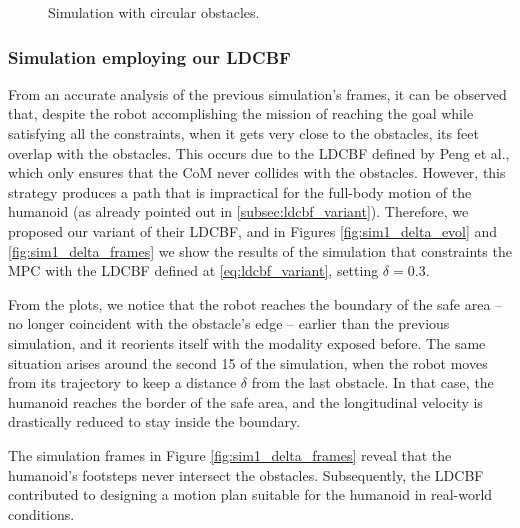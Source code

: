 \begin{figure}[H]
\begin{subfigure}{0.35\textwidth}
    \end{subfigure}
    \caption[short]{Simulation with circular obstacles.}
    \label{fig:sim1_frames}
\end{figure}
\thispagestyle{empty}

\subsubsection{Simulation employing our LDCBF}
From an accurate analysis of the previous simulation's frames, it can be observed that, despite the robot accomplishing the mission of reaching the goal while satisfying all the constraints, when it gets very close to the obstacles, its feet overlap with the obstacles. This occurs due to the LDCBF defined by Peng et al., which only ensures that the CoM never collides with the obstacles. However, this strategy produces a path that is impractical for the full-body motion of the humanoid (as already pointed out in \ref{subsec:ldcbf_variant}). Therefore, we proposed our variant of their LDCBF, and in Figures \ref{fig:sim1_delta_evol} and \ref{fig:sim1_delta_frames} we show the results of the simulation that constraints the MPC with the LDCBF defined at \ref{eq:ldcbf_variant}, setting $\delta=0.3$.

From the plots, we notice that the robot reaches the boundary of the safe area -- no longer coincident with the obstacle's edge -- earlier than the previous simulation, and it reorients itself with the modality exposed before. The same situation arises around the second 15 of the simulation, when the robot moves from its trajectory to keep a distance $\delta$ from the last obstacle.
In that case, the humanoid reaches the border of the safe area, and the longitudinal velocity is drastically reduced to stay inside the boundary.

The simulation frames in Figure \ref{fig:sim1_delta_frames} reveal that the humanoid's footsteps never intersect the obstacles. Subsequently, the LDCBF contributed to designing a motion plan suitable for the humanoid in real-world conditions.

